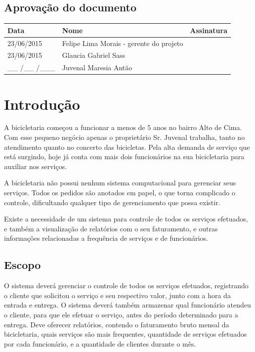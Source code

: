 \documentclass[
	12pt,				%
	openright,
	oneside,			%
	a4paper,			%
	chapter=TITLE,		%
	brazil				%
	]{abntex2}
\begin{document}
\section*{Aprovação do documento}
\begin{flushleft}
	\begin{tabular}{| p{3cm} | p{7cm} | p{5cm} |}
 	   \hline
	    \textbf{Data} 		& \textbf{Nome} 										& \textbf{Assinatura}  \\ \hline
	    23/06/2015	 			& Felipe Lima Morais - gerente do projeto 			& 		 		 		\\ \hline
	    23/06/2015	 			& Glaucia Gabriel Sass					 			&  				 		\\ \hline
	    \_\_ /\_\_ /\_\_\_	 	& Juvenal Maresia Antão 							&  		 				\\ \hline
	\end{tabular}
\end{flushleft}

\newpage
\chapter{Introdução}

A bicicletaria começou a funcionar a menos de 5 anos no bairro Alto de Cima. Com esse pequeno negócio apenas o proprietário Sr. Juvenal trabalha, tanto no atendimento quanto no concerto das bicicletas. Pela alta demanda de serviço que está surgindo, hoje já conta com mais dois funcionários na sua bicicletaria para auxiliar nos serviços.

A bicicletaria não possui nenhum sistema computacional para gerenciar seus serviços. Todos os pedidos são anotados em papel, o que torna complicado o controle, dificultando qualquer tipo de gerenciamento que possa existir.

Existe a necessidade de um sistema para controle de todos os serviços efetuados, e também a visualização de relatórios com o seu faturamento, e outras informações relacionadas a frequência de serviços e de funcionários.

\section{Escopo}

O sistema deverá gerenciar o controle de todos os serviços efetuados, registrando o cliente que solicitou o serviço e seu respectivo valor, junto com a hora da entrada e entrega. O sistema deverá também armazenar qual funcionário atendeu o cliente, para que ele efetuar o serviço, antes do período determinado para a entrega. Deve oferecer relatórios, contendo o  faturamento bruto mensal da bicicletaria, quais serviços são mais frequentes, quantidade de serviços efetuados por cada funcionário, e a quantidade de clientes durante o mês.
\end{document}
